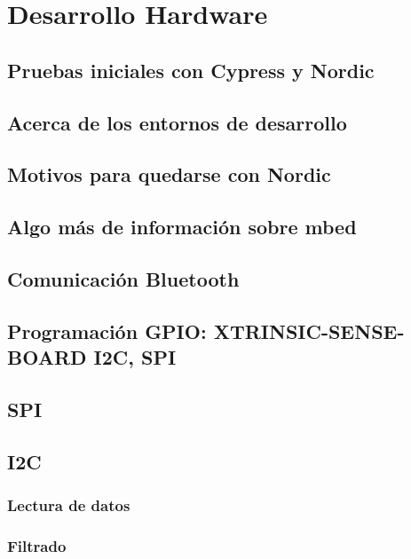 
\cleardoublepage

\chapter{Desarrollo Hardware}
\label{makereference4}

\section{Pruebas iniciales con Cypress y Nordic}
\label{makereference4.1}

\section{Acerca de los entornos de desarrollo}
\label{makereference4.2}

\section{Motivos para quedarse con Nordic}
\label{makereference4.3}

\section{Algo más de información sobre mbed}
\label{makereference4.4}

\section{Comunicación Bluetooth}
\label{makereference4.5}

\section{Programación GPIO: XTRINSIC-SENSE-BOARD I2C, SPI}
\label{makereference4.6}

\section{SPI}
\label{makereference4.7}

\section{I2C}
\label{makereference4.8}

\subsection{Lectura de datos}
\label{makereference4.8.1}

\subsection{Filtrado}
\label{makereference4.8.2}